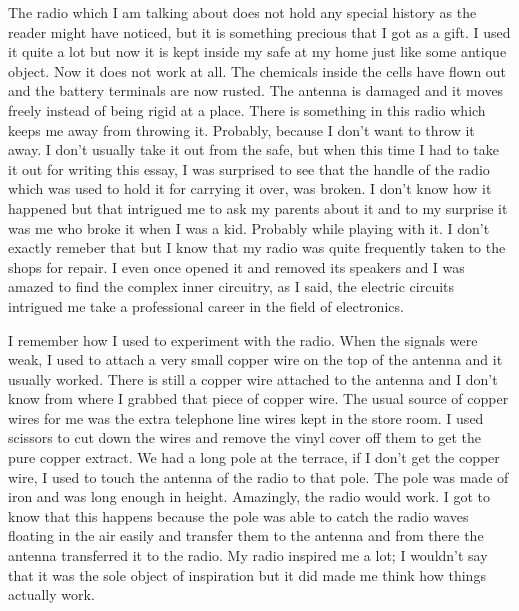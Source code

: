 \documentclass{article}
\begin{document}
{\par The radio which I am talking about does not hold any special history as the reader might have noticed, but it is something precious that I got as a gift. I used it quite a lot but now it is kept inside my safe at my home just like some antique object. Now it does not work at all. The chemicals inside the cells have flown out and the battery terminals are now rusted. The antenna is damaged and it moves freely instead of being rigid at a place. There is something in this radio which keeps me away from throwing it. Probably, because I don't want to throw it away. I don't usually take it out from the safe, but when this time I had to take it out for writing this essay, I was surprised to see that the handle of the radio which was used to hold it for carrying it over, was broken. I don't know how it happened but that intrigued me to ask my parents about it and to my surprise it was me who broke it when I was a kid. Probably while playing with it. I don't exactly remeber that but I know that my radio was quite frequently taken to the shops for repair. I even once opened it and removed its speakers and I was amazed to find the complex inner circuitry, as I said, the electric circuits intrigued me take a professional career in the field of electronics.

\par I remember how I used to experiment with the radio. When the signals were weak, I used to attach a very small copper wire on the top of the antenna and it usually worked. There is still a copper wire attached to the antenna and I don't know from where I grabbed that piece of copper wire. The usual source of copper wires for me was the extra telephone line wires kept in the store room. I used scissors to cut down the wires and remove the vinyl cover off them to get the pure copper extract. We had a long pole at the terrace, if I don't get the copper wire, I used to touch the antenna of the radio to that pole. The pole was made of iron and was long enough in height. Amazingly, the radio would work. I got to know that this happens because the pole was able to catch the radio waves floating in the air easily and transfer them to the antenna and from there the antenna transferred it to the radio. My radio inspired me a lot; I wouldn't say that it was the sole object of inspiration but it did made me think how things actually work.

}
\end{document}
